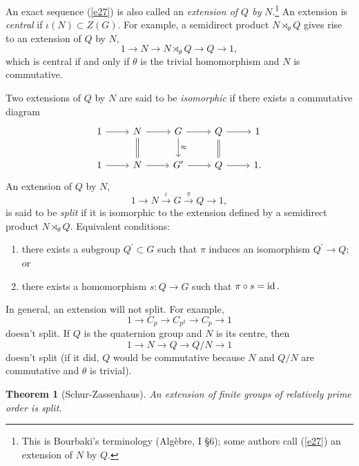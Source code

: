 \documentclass[a4paper,11pt,final,openany]{memoir}%
\newtheorem{theorem}[X]{Theorem}
\theoremstyle{nonumberplain}
\begin{document}
An exact sequence (\ref{e27}) is also called an \emph{extension of $Q$ by}
$N$.\footnote{This is Bourbaki's terminology (Alg\`{e}bre, I \S 6); some
authors call (\ref{e27}) an extension of $N$ by $Q$.}%
An extension is \emph{central}%
%
\emph{\/} if $\iota(N)\subset Z(G)$. For example, a semidirect product
$N\rtimes_{\theta}Q$ gives rise to an extension of $Q$ by $N$,
\[
1\rightarrow N\rightarrow N\rtimes_{\theta}Q\rightarrow Q\rightarrow1,
\]
which is central if and only if $\theta$ is the trivial homomorphism and $N$ is commutative.

Two extensions of $Q$ by $N$ are said to be \emph{isomorphic}%
if there exists a commutative diagram
\[
\begin{tikzcd}1\arrow{r}&N\arrow{r}\arrow[equals]{d}&G\arrow{r}\arrow{d}{\approx}&Q\arrow{r}\arrow[equals]{d}&1\\
1\arrow{r}&N\arrow{r}&G^{\prime}\arrow{r}&Q\arrow{r}&1.\end{tikzcd}
\]
An extension of $Q$ by $N$,%
\[
1\rightarrow N\overset{\iota}{\rightarrow}G\overset{\pi}{\rightarrow
}Q\rightarrow1,
\]
is said to be \emph{split\/}%
if it is isomorphic to the extension defined by a semidirect product
$N\rtimes_{\theta}Q$. Equivalent conditions:

\begin{enumerate}
\item there exists a subgroup $Q^{\prime}\subset G$ such that $\pi$ induces an
isomorphism $Q^{\prime}\rightarrow Q$; or

\item there exists a homomorphism $s\colon Q\rightarrow G$ such that $\pi\circ
s=\operatorname{id}.$
\end{enumerate}

In general, an extension will not split. For example,
\[
1\rightarrow C_{p}\rightarrow C_{p^{2}}\rightarrow C_{p}\rightarrow1
\]
doesn't split. If $Q$ is the quaternion group and $N$ is its centre, then%
\begin{equation}
1\rightarrow N\rightarrow Q\rightarrow Q/N\rightarrow1 \label{e32}%
\end{equation}
doesn't split (if it did, $Q$ would be commutative because $N$ and $Q/N$ are
commutative and $\theta$ is trivial).

\begin{theorem}
[Schur-Zassenhaus]\label{it17}%
An extension of finite groups of relatively prime order is split.
\end{theorem}
\end{document}
